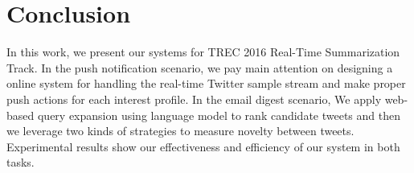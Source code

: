 \section{Conclusion}
In this work, we present our systems for TREC 2016 Real-Time Summarization Track.
In the push notification scenario,
we pay main attention on designing a online system
for handling the real-time Twitter sample stream
and make proper push actions for each interest profile.
In the email digest scenario,
We apply web-based query expansion using language model to rank candidate tweets and
then we leverage two kinds of strategies to measure novelty between tweets.
Experimental results show our effectiveness and efficiency of our system in both tasks.


